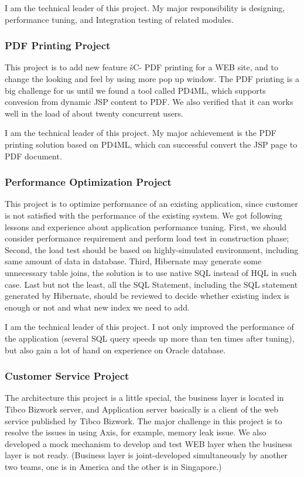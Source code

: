 \documentclass[a4paper,12pt]{article}
\begin{document}
I am the technical leader of this project. My major responsibility is
designing, performance tuning, and Integration testing of related modules.




\subsubsection{PDF Printing Project}
This project is to add new feature šC- PDF printing for a WEB site, and to change the looking and feel by using more pop up window. The PDF printing is a big challenge for us until we found a tool called PD4ML, which supports convesion from dynamic JSP content to PDF. We also verified that it can works well in the load of about twenty concurrent users. 

I am the technical leader of this project. My major achievement is the PDF printing solution based on PD4ML, which can successful convert the JSP page to PDF document. 




\subsubsection{Performance Optimization Project}
This project is to optimize performance of an existing application, since customer is not satisfied with the performance of the existing system. We got following lessons and experience about application performance tuning. First, we should consider performance requirement and perform load test in construction phase; Second, the load test should be based on highly-simulated environment, including same amount of data  in database. Third, Hibernate may generate some unnecessary table joins, the solution is to use native SQL instead of HQL in such case. Last but not the least, all the SQL Statement, including the SQL statement generated by Hibernate, should be reviewed to decide whether existing index is enough or not and what new index we need to add. 

I am the technical leader of this project. I not only improved the performance of the application (several SQL query speeds up more than ten times after tuning), but also gain a lot of hand on experience on Oracle database.



 
\subsubsection{Customer Service Project}
The architecture this project is a little special, the business layer is located in Tibco Bizwork server, and Application server  basically is a client of the web service published by Tibco Bizwork. The major challenge in this project is to resolve the issues in using Axis, for example, memory leak issue. We also developed a mock mechanism to develop and test WEB layer when the business layer is not ready. (Business layer is joint-developed simultaneously by another two teams, one is in America and the other is in Singapore.)
\end{document}
